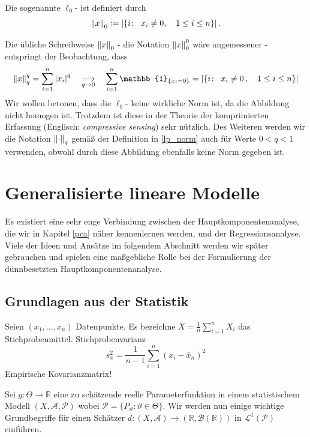 \begin{defn}
Die sogenannte $\ell_0$- ist definiert durch
$$\left\lVert x \right\rVert_{0} \vcentcolon= \left|\{i \colon \enspace x_i \neq 0 , \quad 1 \leq i \leq n\}\right|.$$
\end{defn}

Die übliche Schreibweise $\left\lVert x \right\rVert_0$ - die Notation $\left\lVert x \right\rVert_{0}^{0}$ wäre angemessener - entspringt der Beobachtung, dass 
$$\norm{x}_{q}^{q} = \sum_{i=1}^{n} \abs{x_i}^q \quad \underset{q \rightarrow 0}{\longrightarrow} \quad \sum_{i=1}^{n} \mathbb{1}_{\{x_i = 0\}} = \left|\{i \colon \enspace x_i \neq 0\, , \quad 1 \leq i \leq n\}\right|$$
Wir wollen betonen, dass die $\ell_0$- keine wirkliche Norm ist, da die Abbildung nicht homogen ist. Trotzdem ist diese  in der Theorie der komprimierten Erfassung (Englisch: \textit{compressive sensing}) sehr nützlich. Des Weiteren werden wir die Notation $\left\lVert \cdot \right\rVert_q$ gemäß der Definition in \ref{lp_norm} auch für Werte $0 < q < 1$ verwenden, obwohl durch diese Abbildung ebenfalls keine Norm gegeben ist.


\section{Generalisierte lineare Modelle}
\label{generalized_linear_models}

Es existiert eine sehr enge Verbindung zwischen der Hauptkomponentenanalyse, die wir in Kapitel \ref{pca} näher kennenlernen werden, und der Regressionsanalyse. Viele der Ideen und Ansätze im folgendem Abschnitt werden wir später gebrauchen und spielen eine maßgebliche Rolle bei der Formulierung der dünnbesetzten Hauptkomponentenanalyse.\\

\subsection{Grundlagen aus der Statistik}

Seien $(x_1, \ldots, x_n)$ Datenpunkte.
Es bezeichne
$\overline{X}=\frac{1}{n}\sum _{i=1}^{n}X_{i}$
das Stichprobenmittel.
Stichprobenvarianz
$$s_x^2 = \frac{1}{n-1}\sum_{i=1}^n(x_i - \bar{x}_n)^2$$
Empirische Kovarianzmatrix!

Sei $g\colon \Theta \to \mathbb {R}$ eine zu schätzende reelle Parameterfunktion in einem statistischem Modell $(X,{\mathcal {A}},\mathcal{P})$ wobei $\mathcal{P} = \{P_{\vartheta } \colon \vartheta \in \Theta \}$. Wir werden nun einige wichtige Grundbegriffe für einen Schätzer $d \colon (X, \mathcal{A}) \rightarrow (\mathbb{R}, \mathcal{B}(\mathbb{R}))$ in $\mathcal{L}^1(\mathcal{P})$ einführen.

